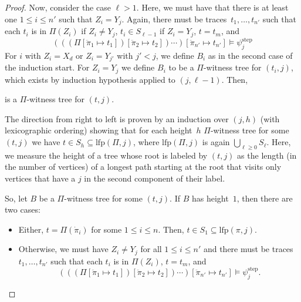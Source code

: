 \documentclass[dvipsnames,10pt,a4paper]{amsart}
\theoremstyle{definition}
\theoremstyle{remark}
\newcommand{\unidisvar}{X_d}
\newcommand{\step}{\mathrm{step}}
\newcommand{\overdot}[1]{\dot{#1}}
\newcommand{\overdotdot}[1]{\ddot{#1}}
\newcommand{\lfp}{\mathrm{lfp}}
\newcommand{\tree}{B}
\begin{document}
\begin{proof}
Now, consider the case $\ell > 1$. Here, we must have that there is at least one $1 \le i \le n'$ such that $Z_i = Y_j$. Again, there must be traces~$t_1, \ldots, t_{n'}$ such that each $t_i$ is in $\Pi(Z_i)$ if $Z_i \neq Y_j$, $t_i \in S_{\ell-1}$ if $Z_i = Y_j$, $t = t_m$, and 
    \[
        (((\Pi[\overdotdot{\pi}_1 \mapsto t_1])[\overdotdot{\pi}_2 \mapsto t_2]) \cdots )[\overdotdot{\pi}_{n'} \mapsto t_{n'}]
    \models \psi_j^\step
    \]
For $i$ with $Z_i = \unidisvar$ or $Z_i = Y_{j'}$ with $j' < j$, we define $\tree_i$ as in the second case of the induction start. 
For $Z_i = Y_{j}$ we define $\tree_i$ to be a $\Pi$-witness tree for $(t_i,j)$, which exists by induction hypothesis applied to $(j, \ell-1)$.
Then,
\begin{center}
\end{center}
    is a $\Pi$-witness tree for $(t,j)$.

The direction from right to left is proven by an induction over $(j,h)$ (with lexicographic ordering) showing that for each height~$h$ $\Pi$-witness tree for some $(t,j)$ we have $t \in S_h \subseteq \lfp(\Pi, j)$, where $\lfp(\Pi,j)$ is again $\bigcup_{\ell \ge 0}S_\ell$.
Here, we measure the height of a tree whose root is labeled by $(t,j)$ as the length (in the number of vertices) of a longest path starting at the root that visits only vertices that have a $j$ in the second component of their label.

So, let $\tree$ be a $\Pi$-witness tree for some $(t,j)$.
If $\tree$ has height~$1$, then there are two cases:
\begin{itemize}
    \item Either, $t = \Pi(\overdot{\pi}_i)$ for some $1 \le i \le n$. Then, $t \in S_1 \subseteq \lfp(\pi,j)$.
    \item Otherwise, we must have $Z_i \neq Y_j$ for all $1 \le i \le n'$ and there must be traces~$t_1, \ldots, t_{n'}$ such that each $t_i$ is in $\Pi(Z_i)$, $t = t_m$, and 
    \[    (((\Pi[\overdotdot{\pi}_1 \mapsto t_1])[\overdotdot{\pi}_2 \mapsto t_2]) \cdots )[\overdotdot{\pi}_{n'} \mapsto t_{n'}]
    \models \psi_j^\step.\]
    

\end{itemize}
\end{proof}
\end{document}
